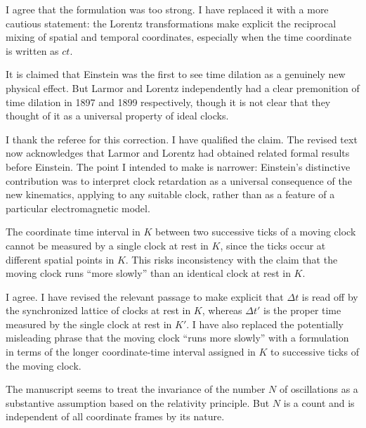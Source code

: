 \documentclass[submitted,11pt]{article}
\begin{document}
\begin{reply}
I agree that the formulation was too strong. I have replaced it with a more cautious statement: the Lorentz transformations make explicit the reciprocal mixing of spatial and temporal coordinates, especially when the time coordinate is written as $ct$.
\end{reply}

\begin{point}
It is claimed that Einstein was the first to see time dilation as a genuinely new physical effect. But Larmor and Lorentz independently had a clear premonition of time dilation in 1897 and 1899 respectively, though it is not clear that they thought of it as a universal property of ideal clocks.
\end{point}

\begin{reply}
I thank the referee for this correction. I have qualified the claim. The revised text now acknowledges that Larmor and Lorentz had obtained related formal results before Einstein. The point I intended to make is narrower: Einstein’s distinctive contribution was to interpret clock retardation as a universal consequence of the new kinematics, applying to any suitable clock, rather than as a feature of a particular electromagnetic model.
\end{reply}

\begin{point}
The coordinate time interval in $K$ between two successive ticks of a moving clock cannot be measured by a single clock at rest in $K$, since the ticks occur at different spatial points in $K$. This risks inconsistency with the claim that the moving clock runs ``more slowly'' than an identical clock at rest in $K$.
\end{point}

\begin{reply}
I agree. I have revised the relevant passage to make explicit that $\Delta t$ is read off by the synchronized lattice of clocks at rest in $K$, whereas $\Delta t'$ is the proper time measured by the single clock at rest in $K'$. I have also replaced the potentially misleading phrase that the moving clock ``runs more slowly'' with a formulation in terms of the longer coordinate-time interval assigned in $K$ to successive ticks of the moving clock.
\end{reply}

\begin{point}
The manuscript seems to treat the invariance of the number $N$ of oscillations as a substantive assumption based on the relativity principle. But $N$ is a count and is independent of all coordinate frames by its nature.
\end{point}
\end{document}
